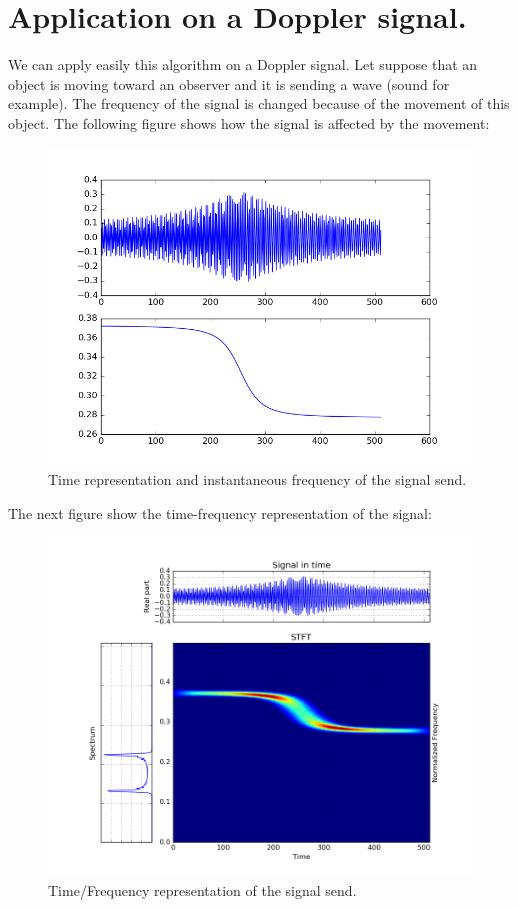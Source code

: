 \section{Application on a Doppler signal.}

We can apply easily this algorithm on a Doppler signal. Let suppose that an object is moving toward an observer and it is sending a wave (sound for example). The frequency of the signal is changed because of the movement of this object. The following figure shows how the signal is affected by the movement:

\begin{figure}[H]
\centering
    \includegraphics[scale=0.6,angle=0]{Images/doopler_signal.png}
    \caption{Time representation and instantaneous frequency of the signal send.}
    \label{fig:doopler_signal}
\end{figure}

The next figure show the time-frequency representation of the signal:

\begin{figure}[H]
\centering
    \includegraphics[scale=0.6,angle=0]{Images/doopler_signal_spec.png}
    \caption{Time/Frequency representation of the signal send.}
    \label{fig:doopler_signal_spec}
\end{figure}

